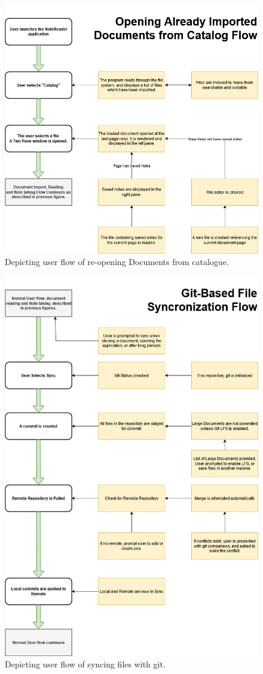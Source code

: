 \begin{figure}
    \centering
    \includegraphics[width=1\linewidth]{Figures/Document_ReOpen_Reading_NoteTaking_Flow.drawio.png}
    \caption{Depicting user flow of re-opening Documents from catalogue.}
    \label{fig:OpeningAlreadyImportedDocuments}
\end{figure}

\begin{figure}
    \centering
    \includegraphics[width=1\linewidth]{Figures/Git_Sync_Flow.drawio.png}
    \caption{Depicting user flow of syncing files with git.}
    \label{fig:gitBasedSync}
\end{figure}